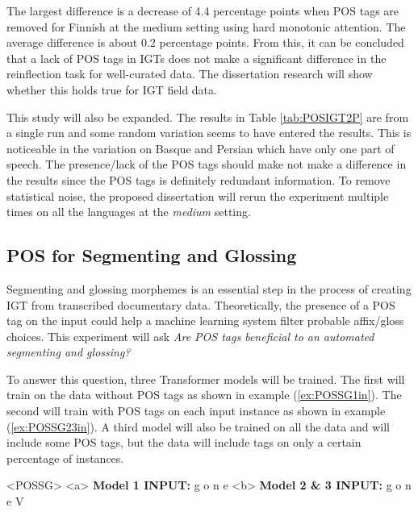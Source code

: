  
The largest difference is a decrease of 4.4 percentage points when POS tags are removed for Finnish at the medium setting using hard monotonic attention. 
The average difference is about 0.2 percentage points.
From this, it can be concluded that a lack of POS tags in IGTs does not make a significant difference in the reinflection task for well-curated data. The dissertation research will show whether this holds true for IGT field data. 

This study will also be expanded. The results in Table \ref{tab:POSIGT2P} are from a single run and some random variation seems to have entered the results. This is noticeable in the variation on Basque and Persian which have only one part of speech. The presence/lack of the POS tags should make not make a difference in the results since the POS tags is definitely redundant information. To remove statistical noise, the proposed dissertation will rerun the experiment multiple times on all the languages at the \textit{medium} setting.


\subsection{POS for Segmenting and Glossing}

Segmenting and glossing morphemes is an essential step in the process of creating IGT from transcribed documentary data. Theoretically, the presence of a POS tag on the input could help a machine learning system filter probable affix/gloss choices. This experiment will ask \textit{Are POS tags beneficial to an automated segmenting and glossing?} 

To answer this question, three Transformer models will be trained. The first will train on the data without POS tags as shown in example (\ref{ex:POSSG1in}). The second will train with POS tags on each input instance as shown in example (\ref{ex:POSSG23in}). A third model will also be trained on all the data and will include some POS tags, but the data will include tags on only a certain percentage of instances. 

\begin{singlespace}
\pex<POSSG>   
\label{ex:POSSG}
\a<a> \textbf{Model 1 INPUT:} \hspace{6 mm} g \hspace{2 mm} o \hspace{2 mm} n \hspace{2 mm} e 
\label{ex:POSSG1in}
\a<b> \textbf{Model 2 \& 3 INPUT:} \hspace{6 mm} g \hspace{2 mm} o \hspace{2 mm} n \hspace{2 mm} e \hspace{2 mm} V
\label{ex:POSSG23in}
\xe
\end{singlespace}

